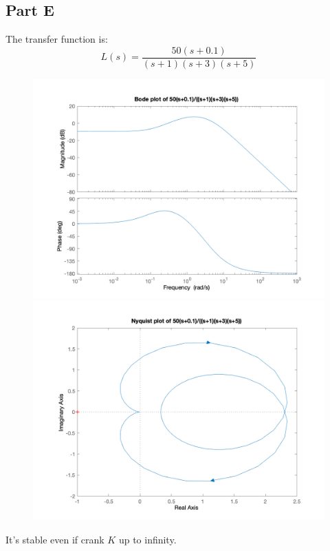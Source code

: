 \documentclass[a4paper]{article}
\begin{document}
\subsection{Part E} 
The transfer function is:
$$
L(s) = \frac{50(s+0.1)}{(s+1)(s+3)(s+5)}
$$
\begin{figure}[H]
\centering
\begin{minipage}[t]{0.48\textwidth}
\centering
\includegraphics[width=\textwidth]{pic/9.png}
\end{minipage}
\begin{minipage}[t]{0.48\textwidth}
\centering
\includegraphics[width=\textwidth]{pic/10.png}
\end{minipage}
\end{figure}
It's stable even if crank $K$ up to infinity.
\end{document}
